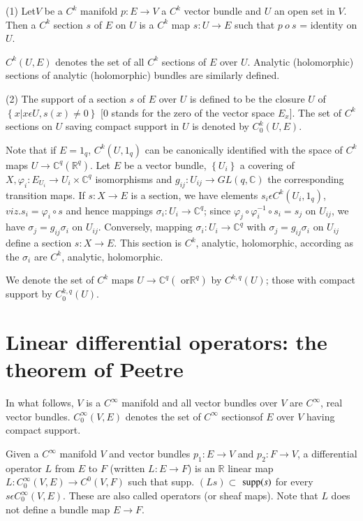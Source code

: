 \begin{defis*}%
  (1) Let\pageoriginale $V$ be a $C^k$ manifold $p:E \to V $ a $C^k$ vector bundle
  and $U$ an open set in $V$. Then a $C^k$ section $s $ of $E$ on $U$
  is a $C^k$ map $s : U \to E$ such that $p~ o~ s$ = identity on $U$. 

  $C^k (U, E)$ denotes the set of all $C^k$ sections of $E$ over
  $U$. Analytic (holomorphic) sections of analytic (holomorphic) bundles
  are similarly defined. 
  
  (2) The support of a section $s$ of $E$ over $U$ is defined
    to be the closure $U$ of $\left\{ x | x \epsilon U, s (x) \neq 0
    \right\}$ [$0$ stands for the zero of the vector space $E_x$]. The
    set of $C^k$ sections on $U$ saving compact support in $U$ is
    denoted by $C^k_0 (U, E)$. 
\end{defis*}
  Note that if $E = 1_q$, $C^k (U,1_q)$ can be canonically identified
  with the space of $C^k$ maps $U \to  \mathbb{C}^q (\mathbb{R}^q)$. Let
$E$ be a vector bundle, $\left\{ U_i\right\}$ a covering of $X,
\varphi_i : E_{U{_i}} \to U_i \times \mathbb{C}^q$ isomorphisms and
$g_{ij}: U_{ij} \to GL (q,\mathbb{C})$ the corresponding transition
maps. If $s : X \to E$ is a section, we have elements $s_i \epsilon
C^k (U_i, 1_q)$, $viz. s_i = \varphi_i \circ s$ and hence mappings
$\sigma_i : U_i \to \mathbb{C}^q$; since $\varphi_j \circ \varphi^{-1}_i \circ
s_i = s_j$ on $U_{ij}$, we have $\sigma_j = g_{ij} \sigma_i$ on
$U_{ij}$. Conversely, mapping $\sigma_i : U_i \to \mathbb{C}^q $ with
$\sigma_j = g_{ij} \sigma_i$ on $U_{ij}$ define a section $s : X \to
E$. This section is $C^k$, analytic, holomorphic, according as the
$\sigma_i$ are $C^k$, analytic, holomorphic. 

We denote the set of $C^k$ maps $U \to \mathbb{C}^q (\text{ or
}\mathbb{R}^q)$ by $C^{k,q} (U)$; those with compact support by
$C_0^{k,q} (U)$. 

\section{Linear differential operators: the theorem of
  Peetre}\label{chap3:sec2}  %

In what follows, $V$ is a $C^\infty$ manifold and all vector bundles
over $V$ are $C^\infty$, real vector bundles. $C^\infty_0 (V, E)$
denotes the set of $C^\infty$ sections\pageoriginale of $E$ over $V$ having compact
support. 

\begin{defi*}%
  Given a $C^\infty$ manifold $V$ and vector bundles $p_1 : E \to V$
  and $p_2 :F \to  V$, a differential operator $L$ from $E$ to $F$
  (written $L : E \to F$) is an $\mathbb{R}$ linear map $L :
  C^\infty_0 (V, E) \to C^0 (V, F)$ such that supp. $(Ls) \subset$
  $\operatorname{supp} (s)$ for every $s \epsilon C^\infty_0 (V, E)$. These are
    also called operators (or sheaf maps). Note that $L$ does not
    define a bundle map $E\to F$. 
\end{defi*}

